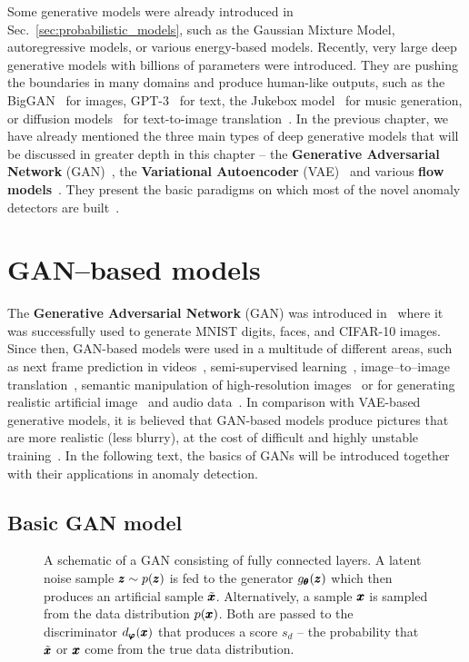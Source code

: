 Some generative models were already introduced in Sec.~\ref{sec:probabilistic_models}, such as the Gaussian Mixture Model, autoregressive models, or various energy-based models. Recently, very large deep generative models with billions of parameters were introduced. They are pushing the boundaries in many domains and produce human-like outputs, such as the BigGAN~\cite{brock2018large} for images, GPT-3~\cite{brown2020language} for text, the Jukebox model~\cite{dhariwal2020jukebox} for music generation, or diffusion models~\cite{sohl2015deep} for text-to-image translation~\cite{saharia2022photorealistic}. In the previous chapter, we have already mentioned the three main types of deep generative models that will be discussed in greater depth in this chapter -- the \textbf{Generative Adversarial Network} (GAN)~\cite{goodfellow2014gan}, the \textbf{Variational Autoencoder} (VAE)~\cite{kingma2013vae} and various \textbf{flow models}~\cite{dinh2014nice}. They present the basic paradigms on which most of the novel anomaly detectors are built~\cite{an2015variational,xu2018unsupervised,wang2018generative,perera2019ocgan,yamaguchi2019adaflow,schmidtNormalizingFlowsNovelty2019}. 


\section{GAN--based models} \label{sec:gan_models}
The \textbf{Generative Adversarial Network} (GAN) was introduced in~\cite{goodfellow2014gan} where it was successfully used to generate MNIST digits, faces, and CIFAR-10 images. Since then, GAN-based models were used in a multitude of different areas, such as next frame prediction in videos~\cite{lotter2015unsupervised}, semi-supervised learning~\cite{salimans2016fmgan}, image--to--image translation~\cite{zhu2016generative}, semantic manipulation of high-resolution images~\cite{wang2018high} or for generating realistic artificial image~\cite{karras2019style} and audio data~\cite{lee2022bigvgan}. In comparison with VAE-based generative models, it is believed that GAN-based models produce pictures that are more realistic (less blurry), at the cost of difficult and highly unstable training~\cite{salimans2016fmgan}. In the following text, the basics of GANs will be introduced together with their applications in anomaly detection. 

\subsection{Basic GAN model}
\begin{figure}
\centering{}\caption{A schematic of a GAN consisting of fully connected layers. A latent
noise sample $\pmb{{z}}\sim p(\pmb{{z}})$ is fed to the generator $g_{\pmb{{\theta}}}(\pmb{{z}})$
which then produces an artificial sample $\tilde{\pmb{{x}}}$. Alternatively,
a sample $\pmb{{x}}$ is sampled from the data distribution $p(\pmb{{x}})$. Both
are passed to the discriminator $d_{\pmb{{\varphi}}}(\pmb{{x}})$ that produces a score
$s_d$ -- the probability that $\tilde{\pmb{{x}}}$ or $\pmb{{x}}$ come from the
true data distribution.}
\label{fig:gan}
\end{figure}

